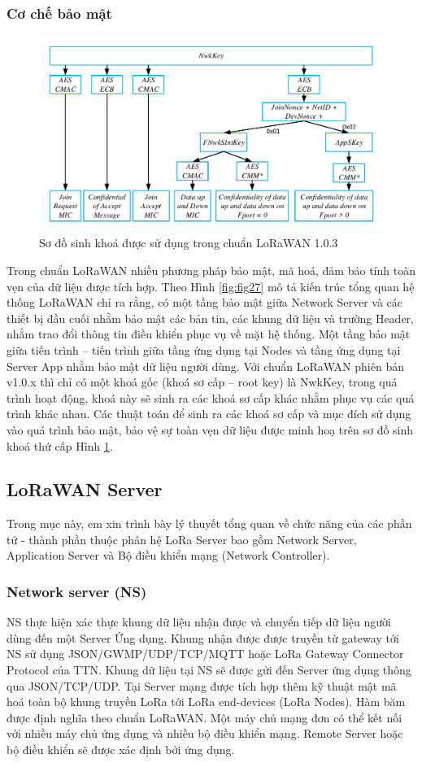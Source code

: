 \subsubsection{Cơ chế bảo mật}
		\begin{figure}[h!] %
			\centering
			\includegraphics[width=\linewidth]{./img/215.pdf}
			\caption{Sơ đồ sinh khoá được sử dụng trong chuẩn LoRaWAN 1.0.3}
			\label{fig:fig215}
	\end{figure}
	Trong chuẩn LoRaWAN nhiều phương pháp bảo mật, mã hoá, đảm bảo tính toàn vẹn của dữ liệu được tích hợp. Theo Hình \ref{fig:fig27} mô tả kiến trúc tổng quan hệ thống LoRaWAN chỉ ra rằng, có một tầng bảo mật giữa Network Server và các thiết bị đầu cuối nhằm bảo mật các bản tin, các khung dữ liệu và trường Header, nhằm trao đổi thông tin điều khiển phục vụ về mặt hệ thống. Một tầng bảo mật giữa tiến trình – tiến trình giữa tầng ứng dụng tại Nodes và tầng ứng dụng tại Server App nhằm bảo mật dữ liệu người dùng. Với chuẩn LoRaWAN phiên bản v1.0.x thì chỉ có một khoá gốc (khoá sơ cấp – root key) là NwkKey, trong quá trình hoạt động, khoá này sẽ sinh ra các khoá sơ cấp khác nhằm phục vụ các quá trình khác nhau.  Các thuật toán để sinh ra các khoá sơ cấp và mục đích sử dụng vào quá trình bảo mật, bảo vệ sự toàn vẹn dữ liệu được minh hoạ trên sơ đồ sinh khoá thứ cấp Hình \ref{fig:fig215}.
	
	\subsection{LoRaWAN Server}
	Trong mục này, em xin trình bày lý thuyết tổng quan về chức năng của các phần tử - thành phần thuộc phân hệ LoRa Server bao gồm Network Server, Application Server và Bộ điều khiển mạng (Network Controller).
	\subsubsection{Network server (NS)}
	NS thực hiện xác thực khung dữ liệu nhận được và chuyển tiếp dữ liệu người dùng đến một Server Ứng dụng. Khung nhận được được truyền từ gateway tới NS sử dụng JSON/GWMP/UDP/TCP/MQTT hoặc LoRa Gateway Connector Protocol của TTN. Khung dữ liệu tại NS sẽ được gửi đến Server ứng dụng thông qua JSON/TCP/UDP. Tại Server mạng được tích hợp thêm kỹ thuật mật mã hoá toàn bộ khung truyền LoRa tới LoRa end-devices (LoRa Nodes). Hàm băm được định nghĩa theo chuẩn LoRaWAN. Một máy chủ mạng đơn có thể kết nối với nhiều máy chủ ứng dụng và nhiều bộ điều khiển mạng. Remote Server hoặc bộ điều khiển sẽ được xác định bởi ứng dụng.
